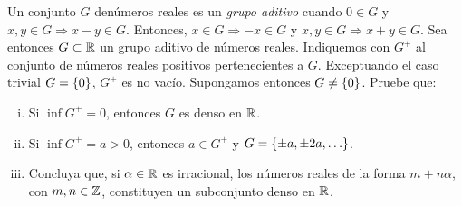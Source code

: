 
Un conjunto $G$ denúmeros reales es un \emph{grupo aditivo} cuando $0\in G$ y $x,y\in G \Rightarrow x-y\in G$.
Entonces, $x\in G \Rightarrow -x\in G$ y $x,y\in G \Rightarrow x+y\in G$.
Sea entonces $G \subset \mathbb{R}$ un grupo aditivo de números reales. Indiquemos con $G^+$ al conjunto de números reales positivos pertenecientes a $G$.
Exceptuando el caso trivial $G=\left\{0\right\}$, $G^+$ es no vacío. Supongamos entonces $G\neq \left\{0\right\}$. Pruebe que:

\begin{enumerate}[i)]
	\item Si $\inf G^+ = 0$, entonces $G$ es denso en $\mathbb{R}$.
	\item Si $\inf G^+ = a > 0$, entonces $a\in G^+$ y $G = \left\{\pm a, \pm 2a, \ldots\right\}$.
	\item Concluya que, si $\alpha\in\mathbb{R}$ es irracional, los números reales de la forma $m+n\alpha$, con $m,n\in\mathbb{Z}$, constituyen un subconjunto denso en $\mathbb{R}$.
\end{enumerate}